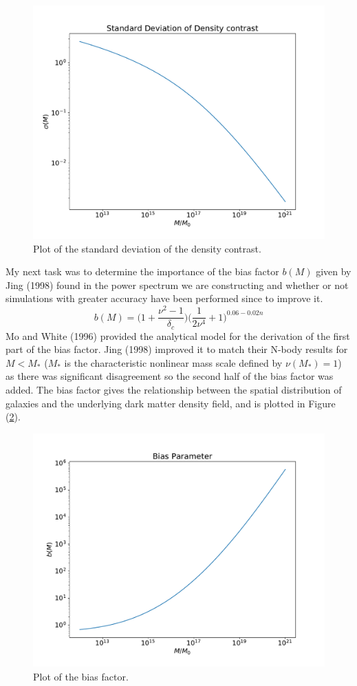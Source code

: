 \documentclass[12pt]{article}
\begin{document}
\begin{figure}[!ht]
    \centering
    \includegraphics[width=0.8\linewidth,keepaspectratio=false]{figures/SD.pdf}
    \caption{Plot of the standard deviation of the density contrast.}
    \label{stdFig}
\end{figure}

My next task was to determine the importance of the bias factor $b(M)$ given by Jing (1998) found in the power spectrum we are constructing and whether or not simulations with greater accuracy have been performed since to improve it.
\begin{equation}
b(M) = \Big (1 + \frac{\nu^2 - 1}{\delta_c} \Big ) \Big (\frac{1}{2\nu^4} + 1 \Big )^{0.06-0.02n}
\end{equation}
Mo and White (1996) provided the analytical model for the derivation of the first part of the bias factor. Jing (1998) improved it to match their N-body results for $M < M_*$ ($M_*$ is the characteristic nonlinear mass scale defined by $\nu(M_*) =  1$) as there was significant disagreement so the second half of the bias factor was added. The bias factor gives the relationship between the spatial distribution of galaxies and the underlying dark matter density field, and is plotted in Figure (\ref{biasFig}).

\begin{figure}[!ht]
    \centering
    \includegraphics[width=0.8\linewidth,keepaspectratio=false]{figures/BIAS.pdf}
    \caption{Plot of the bias factor.}
    \label{biasFig}
\end{figure}
\end{document}
